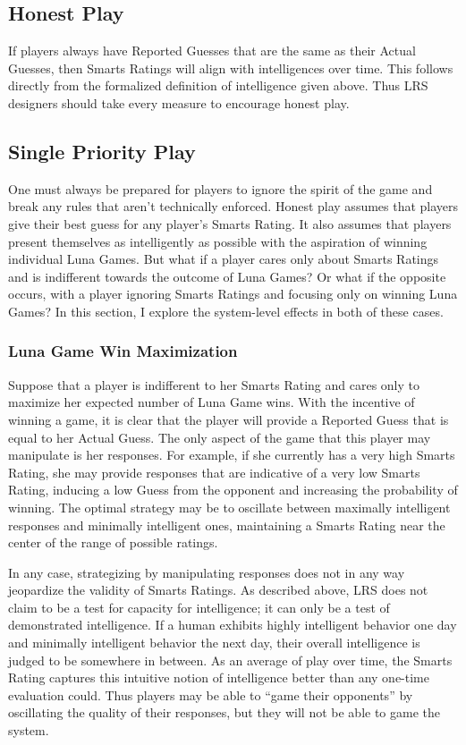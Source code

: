 \subsection{Honest Play}

If players always have Reported Guesses that are the same as their Actual Guesses, then Smarts Ratings will align with intelligences over time. This follows directly from the formalized definition of intelligence given above. Thus LRS designers should take every measure to encourage honest play.

\subsection{Single Priority Play}

One must always be prepared for players to ignore the spirit of the game and break any rules that aren't technically enforced. Honest play assumes that players give their best guess for any player's Smarts Rating. It also assumes that players present themselves as intelligently as possible with the aspiration of winning individual Luna Games. But what if a player cares only about Smarts Ratings and is indifferent towards the outcome of Luna Games? Or what if the opposite occurs, with a player ignoring Smarts Ratings and focusing only on winning Luna Games? In this section, I explore the system-level effects in both of these cases.

\subsubsection{Luna Game Win Maximization}

Suppose that a player is indifferent to her Smarts Rating and cares only to maximize her expected number of Luna Game wins. With the incentive of winning a game, it is clear that the player will provide a Reported Guess that is equal to her Actual Guess. The only aspect of the game that this player may manipulate is her responses. For example, if she currently has a very high Smarts Rating, she may provide responses that are indicative of a very low Smarts Rating, inducing a low Guess from the opponent and increasing the probability of winning. The optimal strategy may be to oscillate between maximally intelligent responses and minimally intelligent ones, maintaining a Smarts Rating near the center of the range of possible ratings. 

In any case, strategizing by manipulating responses does not in any way jeopardize the validity of Smarts Ratings. As described above, LRS does not claim to be a test for capacity for intelligence; it can only be a test of demonstrated intelligence. If a human exhibits highly intelligent behavior one day and minimally intelligent behavior the next day, their overall intelligence is judged to be somewhere in between. As an average of play over time, the Smarts Rating captures this intuitive notion of intelligence better than any one-time evaluation could. Thus players may be able to ``game their opponents'' by oscillating the quality of their responses, but they will not be able to game the system.

